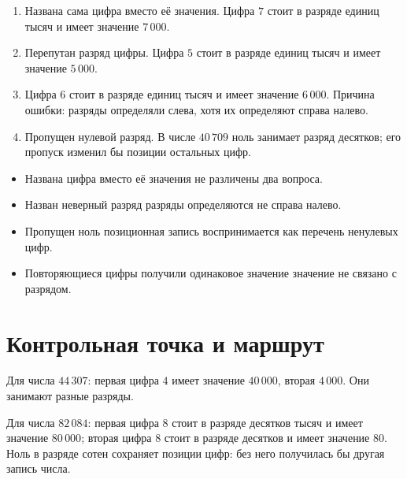 \begin{teacherbox}
  \begin{enumerate}
    \item Названа сама цифра вместо её значения. Цифра \(7\) стоит в разряде
      единиц тысяч и имеет значение \(7\,000\).
    \item Перепутан разряд цифры. Цифра \(5\) стоит в разряде единиц тысяч и
      имеет значение \(5\,000\).
    \item Цифра \(6\) стоит в разряде единиц тысяч и имеет значение \(6\,000\).
      Причина ошибки: разряды определяли слева, хотя их определяют справа
      налево.
    \item Пропущен нулевой разряд. В числе \(40\,709\) ноль занимает разряд
      десятков; его пропуск изменил бы позиции остальных цифр.
  \end{enumerate}
\end{teacherbox}

\begin{teacherbox}
  \begin{itemize}
    \item Названа цифра вместо её значения \textemdash{} не различены два вопроса.
    \item Назван неверный разряд \textemdash{} разряды определяются не справа налево.
    \item Пропущен ноль \textemdash{} позиционная запись воспринимается как перечень
      ненулевых цифр.
    \item Повторяющиеся цифры получили одинаковое значение \textemdash{} значение не
      связано с разрядом.
  \end{itemize}
\end{teacherbox}

\newpage
\section{Контрольная точка и маршрут}

Для числа \(44\,307\): первая цифра \(4\) имеет значение \(40\,000\),
вторая \textemdash{} \(4\,000\). Они занимают разные разряды.

Для числа \(82\,084\): первая цифра \(8\) стоит в разряде десятков тысяч и
имеет значение \(80\,000\); вторая цифра \(8\) стоит в разряде десятков и
имеет значение \(80\). Ноль в разряде сотен сохраняет позиции цифр:
без него получилась бы другая запись числа.

